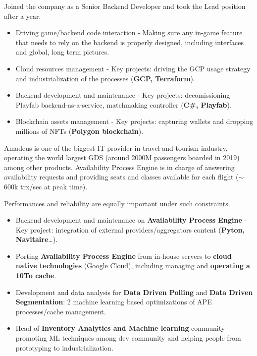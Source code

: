 \documentclass[10pt, a4paper, ragged2e]{altacv}
\begin{document}
		\medskip
		Joined the company as a Senior Backend Developer and took the Lead position after a year.

		\medskip
		\begin{itemize}
			\item Driving game/backend code interaction - Making sure any in-game feature that needs to rely on the backend is properly designed, including interfaces and global, long term pictures.
			\item Cloud resources management - Key projects: driving the GCP usage strategy and industrialization of the processes (\textbf{GCP, Terraform}).
			\item Backend development and maintenance - Key projects: decomissioning Playfab backend-as-a-service, matchmaking controller (\textbf{C\#, Playfab}).
			\item Blockchain assets management - Key projects: capturing wallets and dropping millions of NFTs (\textbf{Polygon blockchain}).
		\end{itemize}
	\divider

		
		Amadeus is one of the biggest IT provider in travel and tourism industry, operating the world largest GDS (around 2000M passengers boarded in 2019) among other products.
		Availability Process Engine is in charge of answering availability requests and providing seats and classes available for each flight (${\sim}$600k trx/sec at peak time).

		\medskip
		Performances and reliability are equally important under such constraints.

		\medskip
		\begin{itemize}
			\item Backend development and maintenance on \textbf{Availability Process Engine} - Key project: integration of external providers/aggregators content (\textbf{Pyton, Navitaire}\ldots).
			\item Porting \textbf{Availability Process Engine} from in-house servers to \textbf{cloud native technologies} (Google Cloud), including managing and \textbf{operating a 10To cache}.
			\item Development and data analysis for \textbf{Data Driven Polling} and \textbf{Data Driven Segmentation}: 2 machine learning based optimizations of APE processes/cache management.
			\item Head of \textbf{Inventory Analytics and Machine learning} community - promoting ML techniques among dev community and helping people from prototyping to industrialization.
		\end{itemize}
	\divider
\end{document}
